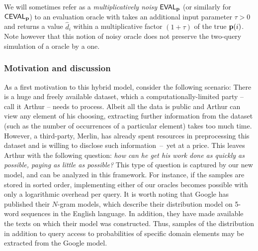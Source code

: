   \begin{remark}
  We will sometimes refer as a \emph{multiplicatively noisy} ${\sf EVAL}_{\mathbf{p}}$ (or similarly for ${\sf CEVAL}_{\mathbf{p}}$) to an evaluation oracle with takes an additional input parameter $\tau > 0$ and returns a value $\hat{d}_i$ within a multiplicative factor $(1+\tau)$ of the true $\mathbf{p}(i)$. Note however that this notion of noisy oracle does not preserve the two-query simulation of a \pdfsamp oracle by a \cdfsamp one.
  \end{remark}
    
    \subsubsection{Motivation and discussion}\label{sec:motivation}
  As a first motivation to this hybrid model, consider the following scenario: There is a huge and freely available dataset, which a computationally-limited party -- call it Arthur -- needs to process. Albeit all the data is public and Arthur can view any element of his choosing, extracting further information from the dataset (such as the number of occurrences of a particular element) takes too much time. However, a third-party, Merlin, has already spent resources in preprocessing this dataset and is willing to disclose such information~--~yet at a price. This leaves Arthur with the following question: \emph{how can he get his work done as quickly as possible, paying as little as possible?} This type of question is captured by our new model, and can be analyzed in this framework. For instance, if the samples are stored in sorted order, implementing either of our oracles becomes possible with only a logarithmic overhead per query. It is worth noting that Google has published their $N$-gram models, which describe their distribution model on 5-word sequences in the English language. In addition, they have made available the texts on which their model was constructed. Thus, samples of the distribution in addition to query access to probabilities of specific domain elements may be extracted from the Google model.
  
